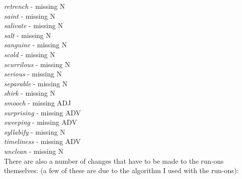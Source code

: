{\it retrench}    - missing N \\
{\it saint}       - missing N \\
{\it salivate}    - missing N \\
{\it salt}        - missing N \\
{\it sanguine}    - missing N \\
{\it scold}       - missing N \\
{\it scurrilous}  - missing N \\
{\it serious}     - missing N \\
{\it separable}   - missing N \\
{\it shirk}       - missing N \\
{\it smooch}      - missing ADJ \\
{\it surprising}  - missing ADV \\
{\it sweeping}    - missing ADV \\
{\it syllabify}   - missing N \\
{\it timeliness}  - missing ADV \\
{\it unclean}     - missing N \\

There are also a number of changes that have to be made to the run-ons themselves: 
(a few of these are due to the algorithm I used with the run-ons):

\smallskip

